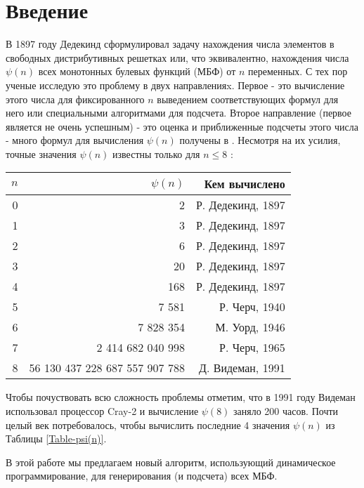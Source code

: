 \newpage
\chapter{Введение}
 В 1897 году Дедекинд сформулировал задачу нахождения числа элементов в
 свободных дистрибутивных решетках или, что эквивалентно,
 нахождения числа $\psi(n)$ всех монотонных булевых функций (МБФ) 
 от $n$ переменных. С тех пор ученые исследую это проблему в двух
 направленияx.
 Первое - это вычисление этого числа для фиксированного $n$
 выведением соответствующих формул для него или специальными
 алгоритмами для подсчета.
 Второе направление (первое является не очень успешным) - это 
 оценка и приближенные подсчеты этого числа - много формул для
 вычисления $\psi(n)$ получены в \cite{Kisielewicz, Kleitman, Korshunov81, Korshunov02}.
 Несмотря на их усилия, точные значения $\psi(n)$ известны
 только для $n \leq 8$ \cite{Fidytek, Tombak, Wiedemann}: \\
\begin{center}
 \begin{tabular}{ r | r | r } 
  $n$ & $\psi(n)$ & Кем вычислено \\
  \hline
  0 & 	2				& \T Р. Дедекинд, 1897 \\
  1 & 	3 				& Р. Дедекинд, 1897 \\
  2 & 	6 				& Р. Дедекинд, 1897 \\
  3 & 	20 				& Р. Дедекинд, 1897 \\
  4 & 	168 				& Р. Дедекинд, 1897 \\
  5 & 	7 581 				& Р. Черч, 1940 \\
  6 &	7 828 354			& М. Уорд, 1946 \\
  7 &	2 414 682 040 998 		& Р. Черч, 1965 \\
  8 &	56 130 437 228 687 557 907 788 	& \B Д. Видеман, 1991 \\
  \hline
  \end{tabular}
\end{center}

Чтобы почуствовать всю сложность проблемы отметим, что в 1991 году
Видеман использовал процессор Cray-2 и вычисление $\psi(8)$
заняло 200 часов. Почти целый век потребовалось, чтобы вычислить
последние 4 значения $\psi(n)$ из Таблицы \ref{Table-psi(n)}.\par
В этой работе мы предлагаем новый алгоритм, использующий 
динамическое программирование,
для генерирования (и подсчета) всех МБФ.
